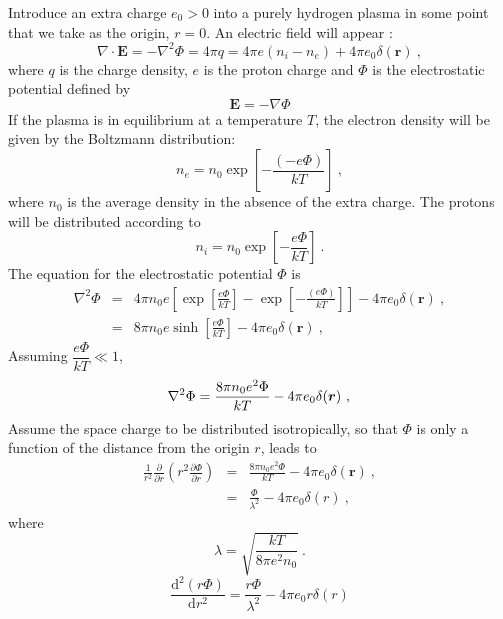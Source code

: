 \documentclass[12pt,a4paper]{article}
\renewcommand{\vec}[1]{\boldsymbol{#1}}
\newcommand{\dif}{\mathrm{d}}
\begin{document}
Introduce an extra charge $e_0 > 0$ into a purely hydrogen plasma in some point that we take as the origin, $r = 0$. An electric field will appear :
\begin{equation*}
\nabla \cdot \vec{E} = -\nabla^2 \Phi = 4\pi q = 4\pi e(n_i -n_e) +4\pi e_0 \delta(\vec{r}) ~,
\end{equation*}
where $q$ is the charge density, $e$ is the proton charge and $\Phi$ is the electrostatic potential defined by
\begin{equation*}
\vec{E} = -\nabla \Phi
\end{equation*}
If the plasma is in equilibrium at a temperature $T$, the electron density will be given by the Boltzmann distribution:
\begin{equation}
n_e = n_0 \exp \left[-\frac{(-e\Phi)}{kT} \right] ~,
\end{equation}
where $n_0$ is the average density in the absence of the extra charge. The protons will be distributed according to
\begin{equation}
n_i = n_0  \exp \left[-\frac{e\Phi}{kT} \right] ~.
\end{equation}
The equation for the electrostatic potential $\Phi$ is
\begin{eqnarray}
\nonumber \nabla^2 \Phi &=& 4\pi n_0 e\left[\exp \left[\frac{e\Phi}{kT} \right] - \exp \left[-\frac{(e\Phi)}{kT} \right]  \right] -4\pi e_0 \delta(\vec{r}) ~, \\
&=& 8\pi n_0 e \sinh \left[ \frac{e\Phi}{kT} \right] -4\pi e_0 \delta(\vec{r}) ~,
\end{eqnarray}
Assuming $\dfrac{e\Phi}{kT} \ll 1$,
\begin{equation}
\nonumber \nabla^2 \Phi = \frac{8\pi n_0 e^2\Phi}{kT} -4\pi e_0 \delta(\vec{r}) ~, \\
\end{equation}
Assume the space charge to be distributed isotropically, so that $\Phi$ is only a function of the distance from the origin $r$, leads to
\begin{eqnarray}
\nonumber \frac{1}{r^2}\frac{\partial}{\partial r}\left( r^2 \frac{\partial \Phi}{\partial r} \right) &=& \frac{8\pi n_0 e^2\Phi}{kT} -4\pi e_0 \delta(\vec{r}) ~, \\
&=& \frac{\Phi}{\lambda^2} -4\pi e_0 \delta(r) ~,
\end{eqnarray}
where
\begin{equation}
\lambda = \sqrt{\frac{kT}{8\pi e^2 n_0}} ~.
\end{equation}
\begin{equation*}
\frac{\dif^2 (r\Phi)}{\dif r^2} = \frac{r\Phi}{\lambda^2} -4\pi e_0 r \delta(r)
\end{equation*}
\end{document}
